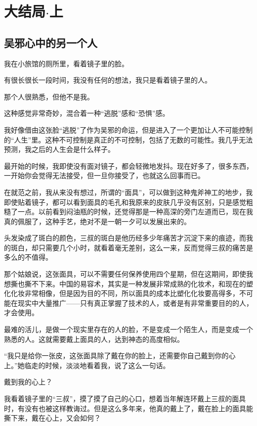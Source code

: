 
\part{大结局$\cdot$上}

\chapter{吴邪心中的另一个人}

我在小旅馆的厕所里，看着镜子里的脸。

有很长很长一段时间，我没有任何的想法，我只是看着镜子里的人。

那个人很熟悉，但他不是我。

这种感觉非常奇妙，混合着一种“逃脱”感和“恐惧”感。

我好像借由这张脸“逃脱”了作为吴邪的命运，但是进入了一个更加让人不可能控制的“人生”里。这种不可控制是真正的不可控制，包括了无数的可能性。我几乎无法预测，我之后的人生会是什么样子。

最开始的时候，我即使没有面对镜子，都会轻微地发抖。现在好多了，很多东西，一开始你会觉得无法接受，但一旦你接受了，也就这么回事而已。

在就范之前，我从来没有想过，所谓的“面具”，可以做到这种鬼斧神工的地步，我即使贴着镜子，都可以看到面具的毛孔和我原来的皮肤几乎没有区别，只是感觉粗糙了一点。以前看到闷油瓶的时候，还觉得那是一种高深的旁门左道而已，现在我真的佩服了，这种手艺，绝对不是一朝一夕可以发展出来的。

头发染成了斑白的颜色，三叔的斑白是他历经多少年痛苦才沉淀下来的痕迹，而我的斑白，却只需要几个小时，就看着毫无差别，这么一来，反而觉得三叔的痛苦是多么的不值得。

那个姑娘说，这张面具，可以不需要任何保养使用四个星期，但在这期间，即使我想撕也撕不下来。中国的易容术，其实是一种发展非常成熟的化妆术，和现在的塑化化妆非常相像，但是因为目的不同，所以面具的成本比塑化化妆要高得多，不可能在现实中大量推广——只有真正掌握了技术的人，或者是有非常重要目的的人，才会使用。

最难的活儿，是做一个现实里存在的人的脸，不是变成一个陌生人，而是变成一个熟悉的人。这就需要戴上面具的人，达到神态的高度相似。

“我只是给你一张皮，这张面具除了戴在你的脸上，还需要你自己戴到你的心上。”她临走的时候，淡淡地看着我，说了这么一句话。

戴到我的心上？

我看着镜子里的“三叔”，摸了摸了自己的心口，想着当年解连环戴上三叔的面具时，有没有也被这样教诲过。但是这么多年来，他真的戴上了，戴在脸上的面具能撕下来，戴在心上，又会如何？

